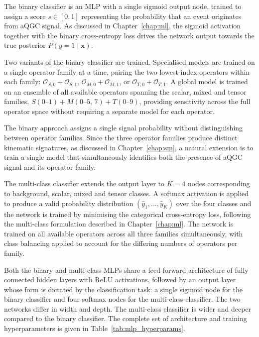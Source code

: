 The binary classifier is an MLP with a single sigmoid output node, trained to assign a score $s \in [0,1]$ representing the probability that an event originates from aQGC signal. As discussed in Chapter~\ref{chap:ml}, the sigmoid activation together with the binary cross-entropy loss drives the network output towards the true posterior $P(y=1 \mid \mathbf{x})$.

Two variants of the binary classifier are trained. Specialised models are trained on a single operator family at a time, pairing the two lowest-index operators within each family: $\mathcal{O}_{S,0}+\mathcal{O}_{S,1}$, $\mathcal{O}_{M,0}+\mathcal{O}_{M,1}$, or $\mathcal{O}_{T,0}+\mathcal{O}_{T,1}$. A global model is trained on an ensemble of all available operators spanning the scalar, mixed and tensor families, $S(0\text{--}1) + M(0\text{--}5,\,7) + T(0\text{--}9)$, providing sensitivity across the full operator space without requiring a separate model for each operator.

The binary approach assigns a single signal probability without distinguishing between operator families. Since the three operator families produce distinct kinematic signatures, as discussed in Chapter~\ref{chap:sm}, a natural extension is to train a single model that simultaneously identifies both the presence of aQGC signal and its operator family.

The multi-class classifier extends the output layer to $K=4$ nodes corresponding to background, scalar, mixed and tensor classes. A softmax activation is applied to produce a valid probability distribution $(\hat{y}_1,\dots,\hat{y}_K)$ over the four classes and the network is trained by minimising the categorical cross-entropy loss, following the multi-class formulation described in Chapter~\ref{chap:ml}. The network is trained on all available operators across all three families simultaneously, with class balancing applied to account for the differing numbers of operators per family.

Both the binary and multi-class MLPs share a feed-forward architecture of fully connected hidden layers with ReLU activations, followed by an output layer whose form is dictated by the classification task: a single sigmoid node for the binary classifier and four softmax nodes for the multi-class classifier. The two networks differ in width and depth. The multi-class classifier is wider and deeper compared to the binary classifier. The complete set of architecture and training hyperparameters is given in Table~\ref{tab:mlp_hyperparams}.

